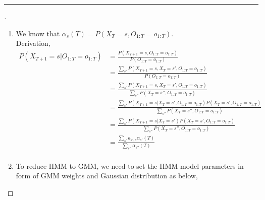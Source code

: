 \documentclass[a4paper, 12pt]{article}
\begin{document}
\hrule
\bigskip

\begin{proof}[]

\hfill

\begin{enumerate}[label={\color{blue}{\textbf{2.\arabic*})}}]
    \item 
        We know that $\alpha_s(T) = P(X_{T}=s, O_{1:T}=o_{1:T})$. \\
        Derivation,
        \begin{align*}
        P(X_{T+1}=s | O_{1:T}=o_{1:T}) &=\frac{P(X_{T+1}=s , O_{1:T}=o_{1:T})}{P(O_{1:T}=o_{1:T})} \tag{Conditional Probability}\\
        &=\frac{\sum\nolimits_{s'}P(X_{T+1}=s,X_{T}=s', O_{1:T}=o_{1:T})}{P(O_{1:T}=o_{1:T})} \tag{Marginalisation}\\
        &=\frac{\sum\nolimits_{s'}P(X_{T+1}=s,X_{T}=s', O_{1:T}=o_{1:T})}{\sum\nolimits_{s''}P(X_T = s'', O_{1:T}=o_{1:T})} \tag{Marginalisation}\\
        &=\frac{\sum\nolimits_{s'}P(X_{T+1}=s|X_{T}=s', O_{1:T}=o_{1:T})P(X_{T}=s', O_{1:T}=o_{1:T})}{\sum\nolimits_{s''}P(X_T = s'', O_{1:T}=o_{1:T})} \tag{Conditional Probability}\\
        &=\frac{\sum\nolimits_{s'}P(X_{T+1}=s|X_{T}=s')P(X_{T}=s', O_{1:T}=o_{1:T})}{\sum\nolimits_{s''}P(X_T = s'', O_{1:T}=o_{1:T})} \tag{Markov Property}\\
        &=\frac{\sum\nolimits_{s'}a_{s',s}\alpha_{s'}(T)}{\sum\nolimits_{s''}\alpha_{s''}(T)} \tag{Definition for $\alpha_s(T)$}\\
    \end{align*}
        
        
    \item 
        To reduce HMM to GMM, we need to set the HMM model parameters in form of GMM weights and Gaussian distribution as below,
        

\end{enumerate}
\end{proof}
\end{document}
